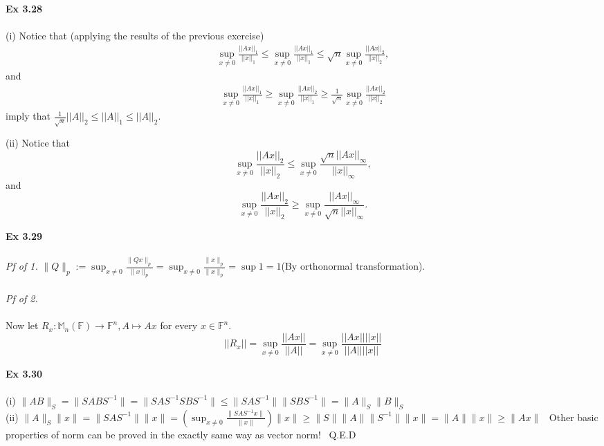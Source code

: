 \documentclass[letterpaper,12pt]{article}
\theoremstyle{definition}
\begin{document}
\begin{spacing}{1.3}{}
	\textbf{Ex 3.28} \\\\
	(i)
	Notice that (applying the results of the previous exercise)
	\begin{align*}
	\sup_{x\neq 0}\frac{||Ax||_1}{||x||_1}\leq
	\sup_{x\neq 0}\frac{||Ax||_1}{||x||_1}\leq
	\sqrt{n}\sup_{x\neq 0}\frac{||Ax||_2}{||x||_2},
	\end{align*}
	and
	\begin{align*}
	\sup_{x\neq 0}\frac{||Ax||_1}{||x||_1}\geq
	\sup_{x\neq 0}\frac{||Ax||_2}{||x||_1}\geq
	\frac{1}{\sqrt{n}}\sup_{x\neq 0}\frac{||Ax||_2}{||x||_2}
	\end{align*}
	imply that $\frac{1}{\sqrt{n}}||A||_2\leq||A||_1\leq||A||_2$.
	
	(ii)
	Notice that
	\begin{equation*}
	\sup_{x\neq 0}\frac{||Ax||_2}{||x||_2}\leq
	\sup_{x\neq 0}\frac{\sqrt{n}||Ax||_\infty}{||x||_\infty},
	\end{equation*}
	and
	\begin{equation*}
	\sup_{x\neq 0}\frac{||Ax||_2}{||x||_2}\geq
	\sup_{x\neq 0}\frac{||Ax||_\infty}{\sqrt{n}||x||_\infty}.
	\end{equation*}
	
	
	\textbf{Ex 3.29} \\\\
	\emph{Pf of 1.} $\|Q\|_p := \sup_{x \neq 0} \frac{\|Qx\|_p}{\|x\|_p} = \sup_{x \neq 0} \frac{\|x\|_p}{\|x\|_p} = \sup 1 = 1 $(By orthonormal transformation). \\\\
	\emph{Pf of 2.} \\\\
	Now let $R_x:\mathbb M_n(\mathbb F)\to\mathbb F^n, A\mapsto Ax$ for every $x\in\mathbb F^n$.
	\begin{equation*}
	||R_x||=\sup_{x\neq 0}\frac{||Ax||}{||A||}=
	\sup_{x\neq 0}\frac{||Ax||||x||}{||A||||x||}
	\end{equation*}
	
	\setlength{\leftskip}{10pt}
	
	\textbf{Ex 3.30} \\\\
	(i) $\|AB\|_S = \|SABS^{-1}\| = \|SAS^{-1} SBS^{-1}\| \leq \|SAS^{-1}\| \|SBS^{-1}\| = \|A\|_S \|B\|_S  $ \\
	(ii) $\|A\|_{S} \|x\| = \|SAS^{-1}\| \|x\| = (\sup_{x \neq 0} \frac{\|SAS^{-1} x\|}{\|x\|}) \|x\| \geq \|S\| \|A\| \|S^{-1}\| \|x\| = \|A\| \|x\| \geq \|Ax\| $ \ Other basic properties of norm can be proved in the exactly same way as vector norm! \ Q.E.D \\\\
	

\end{spacing}
\end{document}
